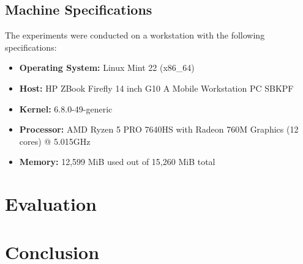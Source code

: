 \documentclass[cic,tc,english]{iiufrgs}
\begin{document}
\section{Machine Specifications}
The experiments were conducted on a workstation with the following specifications:

\begin{itemize}
    \item \textbf{Operating System:} Linux Mint 22 (x86\_64)
    \item \textbf{Host:} HP ZBook Firefly 14 inch G10 A Mobile Workstation PC SBKPF
    \item \textbf{Kernel:} 6.8.0-49-generic
    \item \textbf{Processor:} AMD Ryzen 5 PRO 7640HS with Radeon 760M Graphics (12 cores) @ 5.015GHz
    \item \textbf{Memory:} 12,599 MiB used out of 15,260 MiB total
\end{itemize}



\chapter{Evaluation}
    \label{evaluation}
    


\chapter{Conclusion}
    



\end{document}
